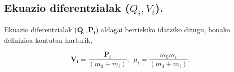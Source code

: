 





\subsection*{Ekuazio diferentzialak ($Q_i,V_i$).}

Ekuazio diferentzialak ($\mathbf{Q_i},\mathbf{P_i}$) aldagai berriekiko idatziko ditugu, honako definizioa kontutan harturik,

\begin{equation*}
\mathbf{V_i}=\frac{\mathbf{P_i}}{(m_0+m_i)}, \ \ \mu_i=\frac{m_0m_i}{(m_0+m_i)}.
\end{equation*}

